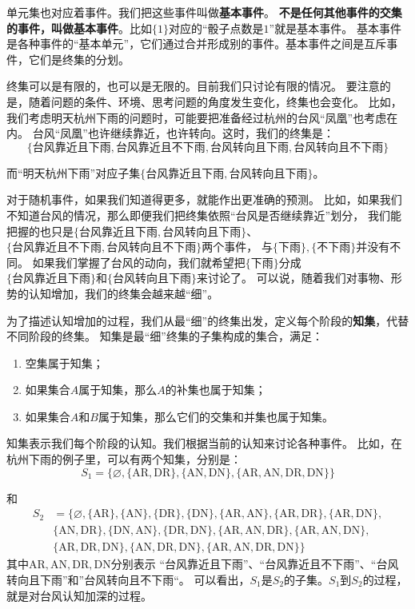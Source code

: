 \documentclass[12pt,UTF8]{ctexbook}
\begin{document}
单元集也对应着事件。我们把这些事件叫做\textbf{基本事件}。
\textbf{不是任何其他事件的交集的事件，叫做基本事件}。比如$\{1\}$对应的“骰子点数是$1$”就是基本事件。
基本事件是各种事件的“基本单元”，它们通过合并形成别的事件。基本事件之间是互斥事件，它们是终集的分划。

终集可以是有限的，也可以是无限的。目前我们只讨论有限的情况。
要注意的是，随着问题的条件、环境、思考问题的角度发生变化，终集也会变化。
比如，我们考虑明天杭州下雨的问题时，可能要把准备经过杭州的台风“凤凰”也考虑在内。
台风“凤凰”也许继续靠近，也许转向。这时，我们的终集是：
$$\{\mbox{台风靠近且下雨}, \mbox{台风靠近且不下雨}, \mbox{台风转向且下雨}, \mbox{台风转向且不下雨}\}$$

而“明天杭州下雨”对应子集$\{\mbox{台风靠近且下雨}, \mbox{台风转向且下雨}\}$。

对于随机事件，如果我们知道得更多，就能作出更准确的预测。
比如，如果我们不知道台风的情况，那么即便我们把终集依照“台风是否继续靠近”划分，
我们能把握的也只是$\{\mbox{台风靠近且下雨}, \mbox{台风转向且下雨}\}$、
$\{\mbox{台风靠近且不下雨}, \mbox{台风转向且不下雨}\}$两个事件，
与$\{\mbox{下雨}\}, \{\mbox{不下雨}\}$并没有不同。
如果我们掌握了台风的动向，我们就希望把$\{\mbox{下雨}\}$分成\\   
$\{\mbox{台风靠近且下雨}\}$和$\{\mbox{台风转向且下雨}\}$来讨论了。
可以说，随着我们对事物、形势的认知增加，我们的终集会越来越“细”。

为了描述认知增加的过程，我们从最“细”的终集出发，定义每个阶段的\textbf{知集}，代替不同阶段的终集。
知集是最“细”终集的子集构成的集合，满足：

\begin{enumerate}
    \item 空集属于知集；
    \item 如果集合$A$属于知集，那么$A$的补集也属于知集；
    \item 如果集合$A$和$B$属于知集，那么它们的交集和并集也属于知集。
\end{enumerate}

知集表示我们每个阶段的认知。我们根据当前的认知来讨论各种事件。
比如，在杭州下雨的例子里，可以有两个知集，分别是：
$$ S_1 = \big\{\varnothing, \{\mbox{AR}, \mbox{DR}\},\{\mbox{AN}, \mbox{DN}\}, \{\mbox{AR}, \mbox{AN}, \mbox{DR}, \mbox{DN}\} \big\}$$

和
\begin{align*}
    S_2 &= \big\{ \varnothing, \{\mbox{AR}\}, \{\mbox{AN}\}, \{\mbox{DR}\}, \{\mbox{DN}\}, \{\mbox{AR}, \mbox{AN}\}, \{\mbox{AR}, \mbox{DR}\}, \{\mbox{AR}, \mbox{DN}\},  \\
    & \{\mbox{AN}, \mbox{DR}\}, \{\mbox{DN}, \mbox{AN}\}, \{\mbox{DR}, \mbox{DN}\},  \{\mbox{AR}, \mbox{AN}, \mbox{DR}\}, \{\mbox{AR}, \mbox{AN}, \mbox{DN}\},  \\
    &  \{\mbox{AR}, \mbox{DR}, \mbox{DN}\},  \{\mbox{AN}, \mbox{DR}, \mbox{DN}\}, \{\mbox{AR}, \mbox{AN}, \mbox{DR}, \mbox{DN}\} \big\}  
\end{align*}
其中$\mbox{AR}, \mbox{AN}, \mbox{DR}, \mbox{DN}$分别表示
“台风靠近且下雨”、“台风靠近且不下雨”、“台风转向且下雨”和”台风转向且不下雨“。
可以看出，$S_1$是$S_2$的子集。$S_1$到$S_2$的过程，就是对台风认知加深的过程。
\end{document}
